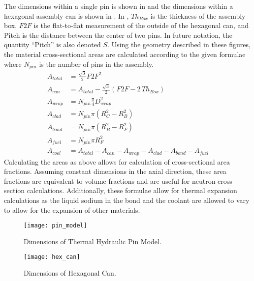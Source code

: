   The dimensions within a single pin is shown in  and the
  dimensions within a hexagonal assembly can is shown in . In
  , $T\!h_{Box}$ is the thickness of the assembly box,
  $F\!2\!F$ is the flat-to-flat measurement of the outside of the hexagonal can,
  and Pitch is the distance between the center of two pins. In future notation,
  the quantity ``Pitch'' is also denoted $S$. Using the geometry described in 
  these figures, the material cross-sectional areas are calculated according to 
  the given formulae where $N_{pin}$ is the number of pins in the assembly.
  \begin{align}
    \label{eq:afrac_first}
    A_{total} &= \frac{\sqrt{3}}{2} F\!2\!F^2 \\
    A_{can} &= A_{total} - 
      \frac{\sqrt{3}}{2} \left(  F\!2\!F - 2 \, T\!h_{Box} \right) \\
    A_{wrap} &= N_{pin} \frac{\pi}{4} D_{wrap}^2 \\
    A_{clad} &= N_{pin} \pi (R_C^2 - R_B^2) \\
    A_{bond} &= N_{pin} \pi (R_B^2 - R_F^2) \\
    A_{fuel} &= N_{pin} \pi R_F^2 \\
    \label{eq:afrac_last}
    A_{cool} &= A_{total} - A_{can} - A_{wrap} - A_{clad} - A_{bond} - A_{fuel}
  \end{align}
  Calculating the areas as above allows for calculation of cross-sectional area
  fractions. Assuming constant dimensions in the axial
  direction, these area fractions are equivalent to volume fractions and are
  useful for neutron cross-section calculations. Additionally, these formulae
  allow for thermal expansion calculations as the liquid sodium in the bond and
  the coolant are allowed to vary to allow for the expansion of other materials.

  \begin{figure}
    \centering
    \texttt{[image: pin\_model]}
    \caption{Dimensions of Thermal Hydraulic Pin Model.}
    \label{fig:pin_model}
  \end{figure}

  \begin{figure}
    \centering
    \texttt{[image: hex\_can]}
    \caption{Dimensions of Hexagonal Can.}
    \label{fig:hex_can}
  \end{figure}

